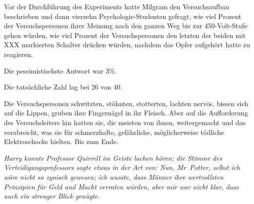 Vor der Durchführung des Experiments hatte Milgram den Versuchsaufbau beschrieben und dann vierzehn Psychologie-Studenten gefragt, wie viel Prozent der Versuchspersonen ihrer Meinung nach den ganzen Weg bis zur 450-Volt-Stufe gehen würden, wie viel Prozent der Versuchspersonen den letzten der beiden mit XXX markierten Schalter drücken würden, nachdem das Opfer aufgehört hatte zu reagieren.

Die pessimistischste Antwort war 3\%.

Die tatsächliche Zahl lag bei 26 von 40.

Die Versuchspersonen schwitzten, stöhnten, stotterten, lachten nervös, bissen sich auf die Lippen, gruben ihre Fingernägel in ihr Fleisch. Aber auf die Aufforderung des Versuchsleiters hin hatten sie, die meisten von ihnen, weitergemacht und das verabreicht, was sie für schmerzhafte, gefährliche, möglicherweise tödliche Elektroschocks hielten. Bis zum Ende.

\emph{Harry konnte Professor Quirrell im Geiste lachen hören; die Stimme des Verteidigungsprofessors sagte etwas in der Art von: \emph{Nun, Mr~Potter, selbst ich wäre} \emph{nicht so zynisch gewesen; ich wusste, dass Männer ihre wertvollsten Prinzipien für Geld und Macht verraten würden, aber mir war nicht klar, dass auch ein strenger Blick genügte.}}


